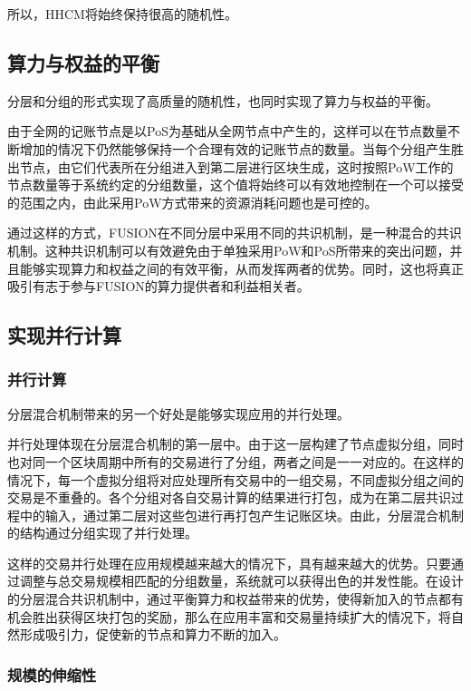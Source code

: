 \documentclass[a4paper,12pt]{article}
\begin{document}
所以，HHCM将始终保持很高的随机性。

\subsection{算力与权益的平衡}

分层和分组的形式实现了高质量的随机性，也同时实现了算力与权益的平衡。

由于全网的记账节点是以PoS为基础从全网节点中产生的，这样可以在节点数量不断增加的情况下仍然能够保持一个合理有效的记账节点的数量。当每个分组产生胜出节点，由它们代表所在分组进入到第二层进行区块生成，这时按照PoW工作的节点数量等于系统约定的分组数量，这个值将始终可以有效地控制在一个可以接受的范围之内，由此采用PoW方式带来的资源消耗问题也是可控的。

通过这样的方式，FUSION在不同分层中采用不同的共识机制，是一种混合的共识机制。这种共识机制可以有效避免由于单独采用PoW和PoS所带来的突出问题，并且能够实现算力和权益之间的有效平衡，从而发挥两者的优势。同时，这也将真正吸引有志于参与FUSION的算力提供者和利益相关者。

\subsection{实现并行计算}

\subsubsection{并行计算}

分层混合机制带来的另一个好处是能够实现应用的并行处理。

并行处理体现在分层混合机制的第一层中。由于这一层构建了节点虚拟分组，同时也对同一个区块周期中所有的交易进行了分组，两者之间是一一对应的。在这样的情况下，每一个虚拟分组将对应处理所有交易中的一组交易，不同虚拟分组之间的交易是不重叠的。各个分组对各自交易计算的结果进行打包，成为在第二层共识过程中的输入，通过第二层对这些包进行再打包产生记账区块。由此，分层混合机制的结构通过分组实现了并行处理。

这样的交易并行处理在应用规模越来越大的情况下，具有越来越大的优势。只要通过调整与总交易规模相匹配的分组数量，系统就可以获得出色的并发性能。在设计的分层混合共识机制中，通过平衡算力和权益带来的优势，使得新加入的节点都有机会胜出获得区块打包的奖励，那么在应用丰富和交易量持续扩大的情况下，将自然形成吸引力，促使新的节点和算力不断的加入。

\subsubsection{规模的伸缩性}
\end{document}
